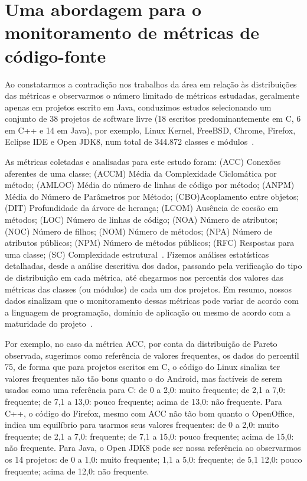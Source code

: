\documentclass{llncs}
\begin{document}

\section{Uma abordagem para o monitoramento de métricas de código-fonte}
\label{sec:abordagem}

Ao constatarmos a contradição nos trabalhos da área em relação às distribuições
das métricas e observarmos o número limitado de métricas estudadas, geralmente
apenas em projetos escrito em Java, conduzimos estudos selecionando um conjunto
de 38 projetos de software livre (18 escritos predominantemente em C, 6 em C++
e 14 em Java), por exemplo, Linux Kernel, FreeBSD, Chrome, Firefox, Eclipse IDE
e Open JDK8, num total de 344.872 classes e
módulos~\cite{meirelles2013monitoramento}.

As métricas coletadas e analisadas para este estudo foram:
(ACC) Conexões aferentes de uma classe;
(ACCM) Média da Complexidade Ciclomática por método;
(AMLOC) Média do número de linhas de código por método;
(ANPM) Média do Número de Parâmetros por Método;
(CBO)Acoplamento entre objetos;
(DIT) Profundidade da árvore de herança;
(LCOM) Ausência de coesão em métodos;
(LOC) Número de linhas de código;
(NOA) Número de atributos;
(NOC) Número de filhos;
(NOM) Número de métodos;
(NPA) Número de atributos públicos;
(NPM) Número de métodos públicos;
(RFC) Respostas para uma classe;
(SC) Complexidade estrutural~\cite{meirelles2013monitoramento}.
%
Fizemos análises estatísticas detalhadas, desde a análise descritiva dos dados,
passando pela verificação do tipo de distribuição em cada métrica, até
chegarmos nos percentis dos valores das métricas das classes (ou módulos) de
cada um dos projetos.
%
Em resumo, nossos dados sinalizam que o monitoramento dessas métricas pode
variar de acordo com a linguagem de programação, domínio de aplicação ou mesmo
de acordo com a maturidade do projeto~\cite{meirelles2013monitoramento}.

Por exemplo, no caso da métrica ACC, por conta da distribuição de Pareto
observada, sugerimos como referência de valores frequentes, os dados do
percentil 75, de forma que para projetos escritos em C, o código do Linux
sinaliza ter valores frequentes não tão bons quanto o do Android, mas factíveis
de serem usados como uma referência para C: de 0 a 2,0: muito frequente; de 2,1
a 7,0: frequente; de 7,1 a 13,0: pouco frequente; acima de 13,0: não frequente.
%
Para C++, o código do Firefox, mesmo com ACC não tão bom quanto o OpenOffice,
indica um equilíbrio para usarmos seus valores frequentes: de 0 a 2,0: muito
frequente; de 2,1 a 7,0: frequente; de 7,1 a 15,0: pouco frequente; acima de
15,0: não frequente.
%
Para Java, o Open JDK8 pode ser nossa referência ao observarmos os 14 projetos:
de 0 a 1,0: muito frequente; 1,1 a 5,0: frequente; de 5,1 12,0: pouco
frequente; acima de 12,0: não frequente.
\end{document}
